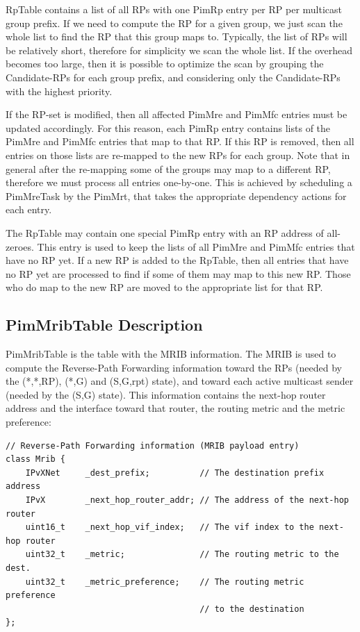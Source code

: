 \documentclass[11pt]{article}
\begin{document}
RpTable contains a list of all RPs with one PimRp entry per RP per
multicast group prefix. If we need to compute the RP for a given group,
we just scan the whole list to find the RP that this group maps
to. Typically, the list of RPs will be relatively short, therefore for
simplicity we scan the whole list. If the overhead becomes too large,
then it is possible to optimize the scan by grouping the Candidate-RPs
for each group prefix, and considering only the Candidate-RPs with the
highest priority.

If the RP-set is modified, then all affected PimMre and PimMfc entries
must be updated accordingly. For this reason, each PimRp entry contains
lists of the PimMre and PimMfc entries that map to that RP. If this RP
is removed, then all entries on those lists are re-mapped to the new RPs
for each group. Note that in general after the re-mapping some of the
groups may map to a different RP, therefore we must process all entries
one-by-one. This is achieved by scheduling a PimMreTask by the PimMrt,
that takes the appropriate dependency actions for each entry.

The RpTable may contain one special PimRp entry with an RP address of
all-zeroes. This entry is used to keep the lists of all PimMre and
PimMfc entries that have no RP yet. If a new RP is added to the RpTable,
then all entries that have no RP yet are processed to find if some
of them may map to this new RP. Those who do map to the new RP are moved to
the appropriate list for that RP.


\subsection{PimMribTable Description}

PimMribTable is the table with the MRIB information. The MRIB is used
to compute the Reverse-Path Forwarding information toward the RPs
(needed by the (*,*,RP), (*,G) and (S,G,rpt) state), and toward
each active multicast sender (needed by the (S,G) state). This
information contains the next-hop router address and the interface
toward that router, the routing metric and the metric preference:

{\small
\begin{verbatim}
// Reverse-Path Forwarding information (MRIB payload entry)
class Mrib {
    IPvXNet     _dest_prefix;          // The destination prefix address
    IPvX        _next_hop_router_addr; // The address of the next-hop router
    uint16_t    _next_hop_vif_index;   // The vif index to the next-hop router
    uint32_t    _metric;               // The routing metric to the dest.
    uint32_t    _metric_preference;    // The routing metric preference
                                       // to the destination
};
\end{verbatim}
} %
\end{document}
